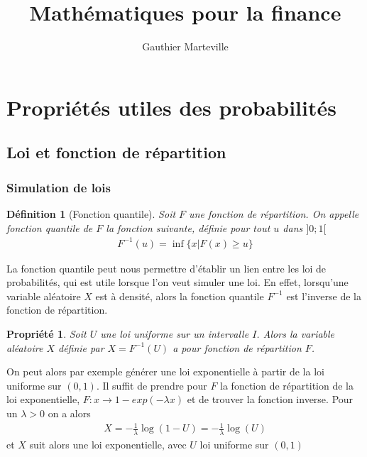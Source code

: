 \documentclass[a4paper]{article}
\title{Mathématiques pour la finance}
\author{Gauthier Marteville}
\newtheorem{propriete}{Propriété}[theorem]
\newtheorem{definition}{Définition}
\begin{document}
% 

\captionsetup[figure]{labelsep= endash,labelfont=sc,justification=justified, font=doublespacing}
\maketitle
\tableofcontents

\section{Propriétés utiles des probabilités}
\subsection{Loi et fonction de répartition}

\subsubsection{Simulation de lois}

\begin{definition}[Fonction quantile]
    Soit $F$ une fonction de répartition. On appelle fonction quantile de $F$ la fonction suivante, définie pour tout $u$ dans $]0;1[$
    \begin{align*}
        F^{-1}(u) = \inf \{x | F(x)\geq u \}       
    \end{align*}
\end{definition}
La fonction quantile peut nous permettre d'établir un lien entre les loi de probabilités, qui est utile lorsque l'on veut simuler une loi.
En effet, lorsqu'une variable aléatoire $X$ est à densité, alors la fonction quantile $F^{-1}$ est l'inverse de la fonction de répartition.

\begin{propriete}
    Soit $U$ une loi uniforme sur un intervalle $I$. Alors la variable aléatoire $X$ définie par $X = F^{-1}(U)$ a pour fonction de répartition $F$.
\end{propriete}
On peut alors par exemple générer une loi exponentielle à partir de la loi uniforme sur $(0,1)$.
Il suffit de prendre pour $F$ la fonction de répartition de la loi exponentielle, $F: x \rightarrow 1 - exp(- \lambda x)$ et de trouver la fonction inverse. Pour un $\lambda > 0$ on a alors 
\begin{align*}
    X = -\frac{1}{\lambda} \log (1-U) =  -\frac{1}{\lambda} \log (U)
\end{align*}
et $X$ suit alors une loi exponentielle, avec $U$ loi uniforme sur $(0,1)$
\end{document}
